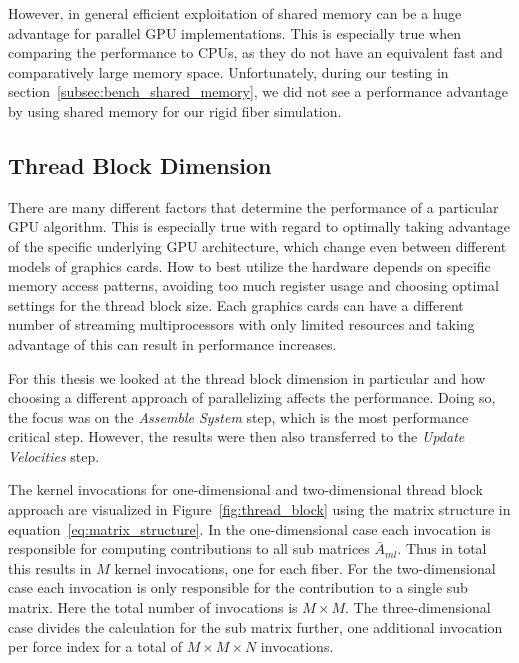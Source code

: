 However, in general efficient exploitation of shared memory can be a huge advantage for parallel GPU implementations. This is especially true when comparing the performance to CPUs, as they do not have an equivalent fast and comparatively large memory space. Unfortunately, during our testing in section~\ref{subsec:bench_shared_memory}, we did not see a performance advantage by using shared memory for our rigid fiber simulation.

\subsection{Thread Block Dimension}
\label{subsec:bench_thread_block}

There are many different factors that determine the performance of a particular GPU algorithm. This is especially true with regard to optimally taking advantage of the specific underlying GPU architecture, which change even between different models of graphics cards. How to best utilize the hardware depends on specific memory access patterns, avoiding too much register usage and choosing optimal settings for the thread block size. Each graphics cards can have a different number of streaming multiprocessors with only limited resources and taking advantage of this can result in performance increases.

For this thesis we looked at the thread block dimension in particular and how choosing a different approach of parallelizing affects the performance. Doing so, the focus was on the \emph{Assemble System} step, which is the most performance critical step. However, the results were then also transferred to the \emph{Update Velocities} step.

The kernel invocations for one-dimensional and two-dimensional thread block approach are visualized in Figure~\ref{fig:thread_block} using the matrix structure in equation~\eqref{eq:matrix_structure}. In the one-dimensional case each invocation is responsible for computing contributions to all sub matrices $\bar{A}_{ml}$. Thus in total this results in $M$ kernel invocations, one for each fiber. For the two-dimensional case each invocation is only responsible for the contribution to a single sub matrix. Here the total number of invocations is $M \times M$. The three-dimensional case divides the calculation for the sub matrix further, one additional invocation per force index for a total of $M \times M \times N$ invocations.


